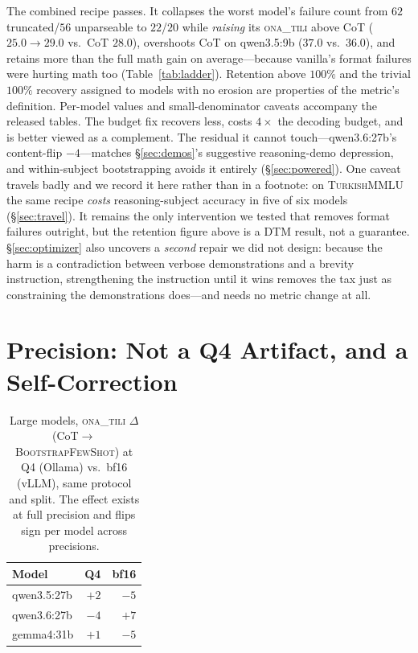 \documentclass[11pt]{article}
\newcommand{\ona}{\textsc{ona\_tili}}
\newcommand{\bsfs}{\textsc{BootstrapFewShot}}
\begin{document}
The combined recipe passes. It collapses the worst model's failure count from
$62$ truncated/$56$ unparseable to $22$/$20$ while \emph{raising} its \ona{} above
CoT ($25.0{\to}29.0$ vs.\ CoT $28.0$), overshoots CoT on qwen3.5:9b
($37.0$ vs.\ $36.0$), and retains more than the full math gain on average---because
vanilla's format failures were hurting math too (Table~\ref{tab:ladder}). Retention
above $100\%$ and the trivial $100\%$ recovery assigned to models with no erosion
are properties of the metric's definition. Per-model values and small-denominator
caveats accompany the released tables. The budget fix recovers less, costs $4\times$
the decoding budget, and is better viewed as a complement. The residual it cannot
touch---qwen3.6:27b's content-flip $-4$---matches \S\ref{sec:demos}'s suggestive
reasoning-demo depression, and within-subject bootstrapping avoids it entirely
(\S\ref{sec:powered}). One caveat travels badly and we record it here rather than in a
footnote: on \textsc{TurkishMMLU} the same recipe \emph{costs} reasoning-subject
accuracy in five of six models (\S\ref{sec:travel}). It remains the only intervention
we tested that removes format failures outright, but the retention figure above is a
DTM result, not a guarantee. \S\ref{sec:optimizer} also uncovers a \emph{second} repair
we did not design: because the harm is a contradiction between verbose demonstrations
and a brevity instruction, strengthening the instruction until it wins removes the tax
just as constraining the demonstrations does---and needs no metric change at all.

\section{Precision: Not a Q4 Artifact, and a Self-Correction}\label{sec:precision}

\begin{table}[t]\centering\small
\caption{Large models, \ona{} $\Delta$ (CoT${\to}$\bsfs{}) at Q4 (Ollama) vs.\ bf16
(vLLM), same protocol and split. The effect exists at full precision and flips sign
per model across precisions.}
\label{tab:precision}
\setlength{\tabcolsep}{6pt}
\begin{tabular}{lrr}
\toprule
Model & Q4 & bf16 \\
\midrule
qwen3.5:27b     & $+2$ & $-5$ \\
qwen3.6:27b     & $-4$ & $+7$ \\
gemma4:31b      & $+1$ & $-5$ \\
\bottomrule
\end{tabular}
\end{table}
\end{document}
